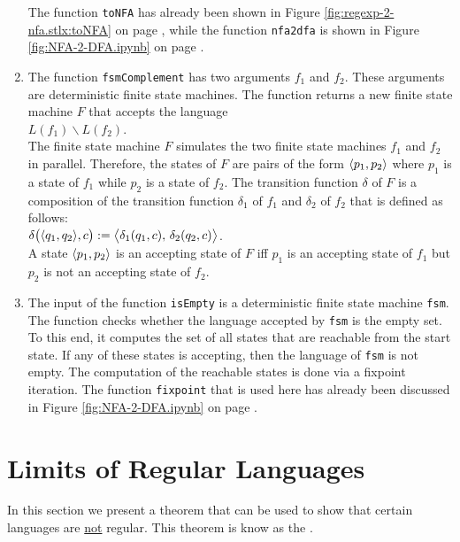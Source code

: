 \begin{enumerate}
      The function \texttt{toNFA} has already been shown in
      Figure \ref{fig:regexp-2-nfa.stlx:toNFA} on page
      \pageref{fig:regexp-2-nfa.stlx:toNFA}, while the function \texttt{nfa2dfa}
      is shown in Figure \ref{fig:NFA-2-DFA.ipynb} on page \pageref{fig:NFA-2-DFA.ipynb}.
\item The function \texttt{fsmComplement} has two arguments $f_1$ and $f_2$.  These
      arguments are deterministic finite state machines.  The function returns a new
      finite state machine $F$ that accepts the language
      \\[0.2cm]
      \hspace*{1.3cm}
      $L(f_1) \backslash L(f_2)$.
      \\[0.2cm]
      The finite state machine $F$ simulates the two finite state machines $f_1$ and $f_2$
      in parallel.  Therefore, the states of $F$ are pairs of the form $\pair(p_1, p_2)$
      where $p_1$ is a state of $f_1$ while $p_2$ is a state of $f_2$.  The transition
      function $\delta$ of $F$ is a composition of the transition function $\delta_1$ of
      $f_1$  and $\delta_2$ of $f_2$ that is defined as follows:
      \\[0.2cm]
      \hspace*{1.3cm}
      $\delta\bigr(\pair(q_1, q_2), c\bigr) := \bigl\langle \delta_1(q_1,c),\, \delta_2(q_2,c)\bigr\rangle$.
      \\[0.2cm]
      A state $\pair(p_1, p_2)$ is an accepting state of $F$ iff $p_1$ is an accepting state of $f_1$ but
      $p_2$ is not an accepting state of $f_2$.
\item The input of the function \texttt{isEmpty} is a deterministic finite state machine
      \texttt{fsm}.  The function checks whether the language accepted by \texttt{fsm} is
      the empty set.  To this end, it computes the set of all states that are reachable
      from the start state.  If any of these states is accepting, then the language
      of \texttt{fsm} is not empty.  The computation of the reachable states is done via a fixpoint
      iteration.  The function \texttt{fixpoint} that is used here has already been discussed in
      Figure \ref{fig:NFA-2-DFA.ipynb} on page \pageref{fig:NFA-2-DFA.ipynb}.
\end{enumerate}

\section{Limits of Regular Languages}
In this section we present a theorem that can be used to show that certain languages are
\underline{not} regular.  This theorem is know as the 
\href{https://en.wikipedia.org/wiki/Pumping_lemma_for_regular_languages}{}.

